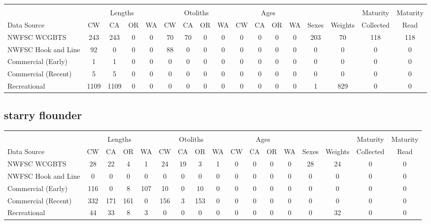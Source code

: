 \documentclass[12pt,]{article}
\begin{document}
\begin{table}[ht]
\centering
\begingroup\fontsize{10pt}{10pt}\selectfont
\begin{tabular}{|l|cccc|cccc|cccc|c|c|c|c|}
  \hline
 &  &  &  &  &  &  &  &  &  &  &  &  &  &  &  &  \\ 
   & \multicolumn{4}{c}{Lengths} &  \multicolumn{4}{c}{Otoliths} & \multicolumn{4}{c}{Ages} &  & & Maturity & Maturity\\
 Data Source & CW & CA & OR & WA & CW & CA & OR & WA & CW & CA & OR & WA & Sexes & Weights & Collected & Read\\
 \hline
NWFSC WCGBTS & 243 & 243 & 0 & 0 & 70 & 70 & 0 & 0 & 0 & 0 & 0 & 0 & 203 & 70 & 118 & 118 \\ 
  NWFSC Hook and Line & 92 & 0 & 0 & 0 & 88 & 0 & 0 & 0 & 0 & 0 & 0 & 0 & 0 & 0 & 0 & 0 \\ 
  Commercial (Early) & 1 & 1 & 0 & 0 & 0 & 0 & 0 & 0 & 0 & 0 & 0 & 0 & 0 & 0 & 0 & 0 \\ 
  Commercial (Recent) & 5 & 5 & 0 & 0 & 0 & 0 & 0 & 0 & 0 & 0 & 0 & 0 & 0 & 0 & 0 & 0 \\ 
  Recreational & 1109 & 1109 & 0 & 0 & 0 & 0 & 0 & 0 & 0 & 0 & 0 & 0 & 1 & 829 & 0 & 0 \\ 
   \hline
\end{tabular}
\endgroup
\end{table}

\FloatBarrier  

\newpage  

\subsection{starry flounder}\label{starry-flounder}

\begin{table}[ht]
\centering
\begingroup\fontsize{10pt}{10pt}\selectfont
\begin{tabular}{|l|cccc|cccc|cccc|c|c|c|c|}
  \hline
 &  &  &  &  &  &  &  &  &  &  &  &  &  &  &  &  \\ 
   & \multicolumn{4}{c}{Lengths} &  \multicolumn{4}{c}{Otoliths} & \multicolumn{4}{c}{Ages} &  & & Maturity & Maturity\\
 Data Source & CW & CA & OR & WA & CW & CA & OR & WA & CW & CA & OR & WA & Sexes & Weights & Collected & Read\\
 \hline
NWFSC WCGBTS & 28 & 22 & 4 & 1 & 24 & 19 & 3 & 1 & 0 & 0 & 0 & 0 & 28 & 24 & 0 & 0 \\ 
  NWFSC Hook and Line & 0 & 0 & 0 & 0 & 0 & 0 & 0 & 0 & 0 & 0 & 0 & 0 & 0 & 0 & 0 & 0 \\ 
  Commercial (Early) & 116 & 0 & 8 & 107 & 10 & 0 & 10 & 0 & 0 & 0 & 0 & 0 & 0 & 0 & 0 & 0 \\ 
  Commercial (Recent) & 332 & 171 & 161 & 0 & 156 & 3 & 153 & 0 & 0 & 0 & 0 & 0 & 0 & 0 & 0 & 0 \\ 
  Recreational & 44 & 33 & 8 & 3 & 0 & 0 & 0 & 0 & 0 & 0 & 0 & 0 & 0 & 32 & 0 & 0 \\ 
   \hline
\end{tabular}
\endgroup
\end{table}
\end{document}
